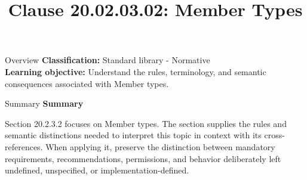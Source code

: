 \documentclass[10pt,letterpaper]{article}
\title{Clause 20.02.03.02: Member Types}
\author{}
\date{}
\begin{document}
\maketitle
\begin{CornellOverviewBox}{Overview}
\textbf{Classification:} Standard library - Normative\\[2pt]
\textbf{Learning objective:} Understand the rules, terminology, and semantic consequences associated with Member types.
\end{CornellOverviewBox}\begin{CornellSummaryBox}{Summary}
{\sffamily\bfseries\color{Accent} Summary}\par\vspace{3pt}Section 20.2.3.2 focuses on Member types. The section supplies the rules and semantic distinctions needed to interpret this topic in context with its cross-references. When applying it, preserve the distinction between mandatory requirements, recommendations, permissions, and behavior deliberately left undefined, unspecified, or implementation-defined.
\end{CornellSummaryBox}
\end{document}
